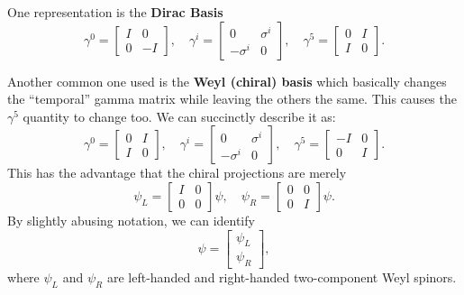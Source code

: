One representation is the \textbf{Dirac Basis}
\begin{equation}
\gamma^0 = \begin{bmatrix} I & 0 \\ 0 & -I \end{bmatrix},\quad \gamma^i = \begin{bmatrix} 0 & \sigma^i \\ -\sigma^i & 0 \end{bmatrix},\quad \gamma^5 = \begin{bmatrix} 0 & I \\ I & 0 \end{bmatrix}.
\end{equation}

Another common one used is the \textbf{Weyl (chiral) basis} which basically changes the ``temporal'' gamma matrix while leaving the others the same. This causes the $\gamma^5$ quantity to change too. We can succinctly describe it as:
\begin{equation}
\gamma^0 = \begin{bmatrix} 0 & I \\ I & 0 \end{bmatrix},\quad \gamma^i = \begin{bmatrix} 0 & \sigma^i \\ -\sigma^i & 0 \end{bmatrix},\quad \gamma^5 = \begin{bmatrix} -I & 0 \\ 0 & I \end{bmatrix}.
\end{equation}
This has the advantage that the chiral projections are merely
\begin{equation}
\psi_L=\begin{bmatrix} I & 0 \\0 & 0 \end{bmatrix}\psi,\quad \psi_R=\begin{bmatrix} 0 & 0 \\0 & I \end{bmatrix}\psi.
\end{equation}
By slightly abusing notation, we can identify
\begin{equation}
\psi=\begin{bmatrix} \psi_L \\ \psi_R \end{bmatrix},
\end{equation}
where $\psi_L$ and $\psi_R$ are left-handed and right-handed two-component Weyl spinors.

